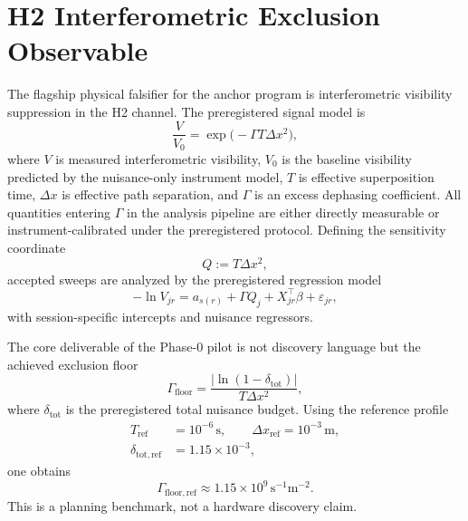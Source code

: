 \documentclass[aps,prd,twocolumn,superscriptaddress,nofootinbib]{revtex4-2}
\begin{document}
\section{H2 Interferometric Exclusion Observable}
The flagship physical falsifier for the anchor program is interferometric visibility suppression in the H2 channel. The preregistered signal model is
\begin{equation}
\frac{V}{V_0}=\exp\bigl(-\Gamma T\Delta x^2\bigr),
\label{eq:h2signal}
\end{equation}
where $V$ is measured interferometric visibility, $V_0$ is the baseline visibility predicted by the nuisance-only instrument model, $T$ is effective superposition time, $\Delta x$ is effective path separation, and $\Gamma$ is an excess dephasing coefficient.
All quantities entering $\Gamma$ in the analysis pipeline are either directly measurable or instrument-calibrated under the preregistered protocol.
Defining the sensitivity coordinate
\begin{equation}
Q:=T\Delta x^2,
\end{equation}
accepted sweeps are analyzed by the preregistered regression model
\begin{equation}
-\ln V_{jr}=a_{s(r)}+\Gamma Q_j+X_{jr}^{\top}\beta+\varepsilon_{jr},
\label{eq:h2reg}
\end{equation}
with session-specific intercepts and nuisance regressors.

The core deliverable of the Phase-0 pilot is not discovery language but the achieved exclusion floor
\begin{equation}
\Gamma_{\mathrm{floor}}=\frac{|\ln(1-\delta_{\mathrm{tot}})|}{T\Delta x^2},
\label{eq:gammfloor}
\end{equation}
where $\delta_{\mathrm{tot}}$ is the preregistered total nuisance budget. Using the reference profile
\begin{equation}
\begin{split}
T_{\mathrm{ref}} &= 10^{-6}\,\mathrm{s},\qquad \Delta x_{\mathrm{ref}}=10^{-3}\,\mathrm{m}, \\
\delta_{\mathrm{tot,ref}} &= 1.15\times10^{-3},
\end{split}
\end{equation}
one obtains
\begin{equation}
\Gamma_{\mathrm{floor,ref}}\approx 1.15\times10^9\,\mathrm{s}^{-1}\mathrm{m}^{-2}.
\end{equation}
This is a planning benchmark, not a hardware discovery claim.
\end{document}
